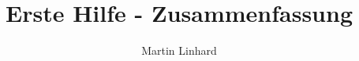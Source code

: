 \documentclass{scrbook}
\begin{document}
\author{Martin Linhard}
\title{Erste Hilfe - Zusammenfassung}
\maketitle
\newpage
\tableofcontents


\end{document}
